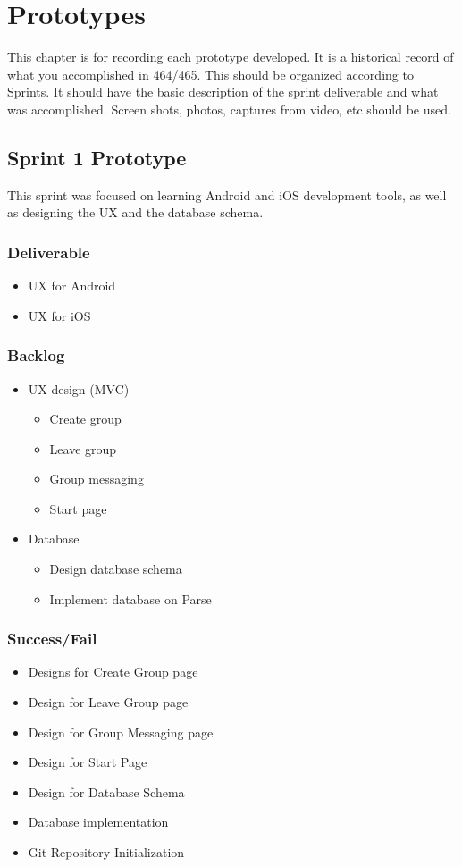 

\chapter{Prototypes}

This chapter is for recording each prototype developed.  It is a historical record of what you accomplished in 464/465.   This should be organized according to Sprints.  It should have the basic description of the sprint deliverable and what was accomplished.  Screen shots, photos, captures from video, etc should be used.  

\section{Sprint 1 Prototype}
This sprint was focused on learning Android and iOS development tools, as well as designing the UX and the database schema.
\subsection{Deliverable}
	\begin{itemize}
		\item UX for Android
		\item UX for iOS
	\end{itemize}
\subsection{Backlog}
	\begin{itemize}
		\item UX design (MVC)
		\begin{itemize}
			\item Create group
			\item Leave group
			\item Group messaging
			\item Start page
		\end{itemize}
		\item Database
		\begin{itemize}
			\item Design database schema
			\item Implement database on Parse
		\end{itemize}
	\end{itemize}
\subsection{Success/Fail}
\begin{itemize}
	\item Designs for Create Group page
	\item Design for Leave Group page
	\item Design for Group Messaging page
	\item Design for Start Page
	\item Design for Database Schema
	\item Database implementation
	\item Git Repository Initialization
\end{itemize}

